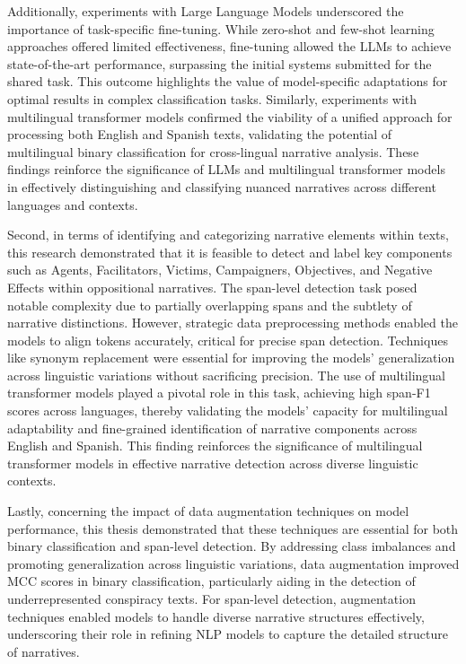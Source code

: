 \documentclass{Configuration_Files/PoliMi3i_thesis}
\begin{document}
Additionally, experiments with Large Language Models underscored the importance of task-specific fine-tuning. While zero-shot and few-shot learning approaches offered limited effectiveness, fine-tuning allowed the LLMs to achieve state-of-the-art performance, surpassing the initial systems submitted for the shared task. This outcome highlights the value of model-specific adaptations for optimal results in complex classification tasks. Similarly, experiments with multilingual transformer models confirmed the viability of a unified approach for processing both English and Spanish texts, validating the potential of multilingual binary classification for cross-lingual narrative analysis. These findings reinforce the significance of LLMs and multilingual transformer models in effectively distinguishing and classifying nuanced narratives across different languages and contexts.

Second, in terms of identifying and categorizing narrative elements within texts, this research demonstrated that it is feasible to detect and label key components such as Agents, Facilitators, Victims, Campaigners, Objectives, and Negative Effects within oppositional narratives. The span-level detection task posed notable complexity due to partially overlapping spans and the subtlety of narrative distinctions. However, strategic data preprocessing methods enabled the models to align tokens accurately, critical for precise span detection. Techniques like synonym replacement were essential for improving the models' generalization across linguistic variations without sacrificing precision. The use of multilingual transformer models played a pivotal role in this task, achieving high span-F1 scores across languages, thereby validating the models’ capacity for multilingual adaptability and fine-grained identification of narrative components across English and Spanish. This finding reinforces the significance of multilingual transformer models in effective narrative detection across diverse linguistic contexts.

Lastly, concerning the impact of data augmentation techniques on model performance, this thesis demonstrated that these techniques are essential for both binary classification and span-level detection. By addressing class imbalances and promoting generalization across linguistic variations, data augmentation improved MCC scores in binary classification, particularly aiding in the detection of underrepresented conspiracy texts. For span-level detection, augmentation techniques enabled models to handle diverse narrative structures effectively, underscoring their role in refining NLP models to capture the detailed structure of narratives.
\end{document}

